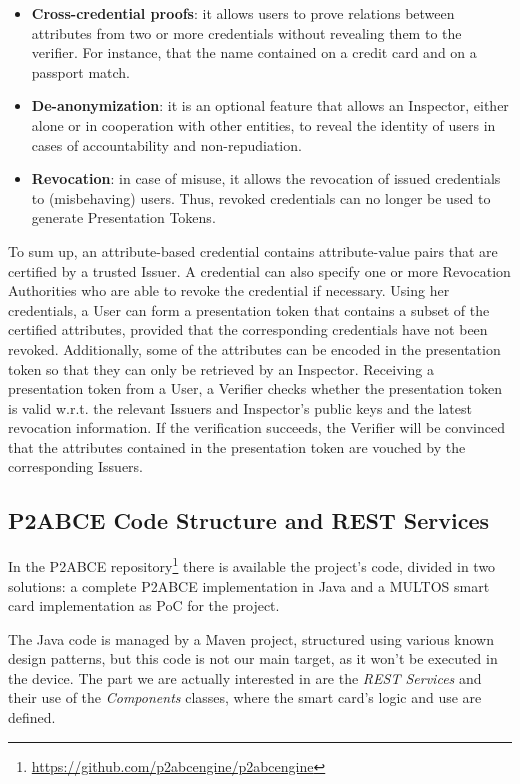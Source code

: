 \begin{itemize}
	\item \textbf{Cross-credential proofs}: it allows users to prove relations between attributes
	from two or more credentials without revealing them to the verifier. For
	instance, that the name contained on a credit card and on a passport
	match.
	
	\item \textbf{De-anonymization}: it is an optional feature that allows an Inspector, either
	alone or in cooperation with other entities, to reveal the identity of users
	in cases of accountability and non-repudiation.
	
	\item \textbf{Revocation}: in case of misuse, it allows the revocation of issued credentials
	to (misbehaving) users. Thus, revoked credentials can no longer be used to
	generate Presentation Tokens.

\end{itemize}

To sum up, an attribute-based credential contains attribute-value pairs that are certified by a trusted Issuer. A credential can also specify one or more Revocation Authorities who are able to revoke the credential if necessary. Using her credentials, a User can form a presentation token that contains a subset of the certified attributes, provided that the corresponding credentials have not been revoked. Additionally, some of the attributes can be encoded in the presentation token so that they can only be retrieved by an Inspector. Receiving a presentation token from a User, a Verifier checks whether the presentation token is valid w.r.t. the relevant Issuers and Inspector's public keys and the latest revocation information. If the verification succeeds, the Verifier will be convinced that the attributes contained in the presentation token are vouched by the corresponding Issuers.


\hfil



\subsection{P2ABCE Code Structure and REST Services}


In the P2ABCE repository\footnote{\url{https://github.com/p2abcengine/p2abcengine}} there is available the project's code, divided in two solutions: a complete P2ABCE implementation in Java and a MULTOS smart card implementation as PoC for the project.


The Java code is managed by a Maven project, structured using various known design patterns, but this code is not our main target, as it won't be executed in the device. The part we are actually interested in are the \textit{REST Services} and their use of the \textit{Components} classes, where the smart card's logic and use are defined.

